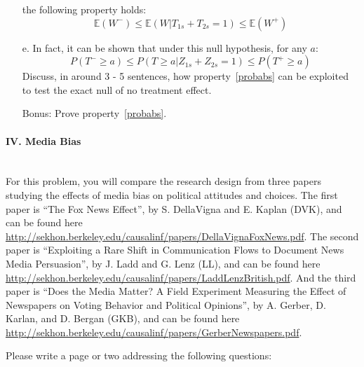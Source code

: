 \documentclass{article}
\newcommand{\E}[0]{\mathbb{E}}
\begin{document}
\begin{itemize}
          the following property holds:
          $$
           \E(W^-)\leq  \E(W| T_{1s} + T_{2s} =1) \leq \E(W^+) 
          $$
        \item[e.]
          In fact, it can be shown that under this null hypothesis, for any $a$:
          \begin{equation}
            P(T^- \geq a) \leq P(T \geq a | Z_{1s} + Z_{2s} = 1) \leq P(T^+ \geq a)
            \label{probabs}
          \end{equation}
          Discuss, in around 3 - 5 sentences, how property~\eqref{probabs} can be
          exploited to test the exact null of no treatment effect. 
        \item[Bonus:]
          Prove property~\eqref{probabs}. 
      \end{itemize}

\paragraph{\Large IV. Media Bias \\ \\}

For this problem, you will compare the research design from three
papers studying the effects of media bias on political attitudes and
choices.  The first paper is ``The Fox News Effect'', by S.
DellaVigna and E. Kaplan (DVK), and can be found here
\url{http://sekhon.berkeley.edu/causalinf/papers/DellaVignaFoxNews.pdf}. The
second paper is ``Exploiting a Rare Shift in Communication Flows to
Document News Media Persuasion'', by J. Ladd and G. Lenz (LL),
and can be found here
\url{http://sekhon.berkeley.edu/causalinf/papers/LaddLenzBritish.pdf}. And
the third paper is ``Does the Media Matter? A Field Experiment
Measuring the Effect of Newspapers on Voting Behavior and Political
Opinions'', by A. Gerber, D. Karlan, and D. Bergan (GKB), and
can be found here
\url{http://sekhon.berkeley.edu/causalinf/papers/GerberNewspapers.pdf}.

\vspace{1em}

Please write a page or two addressing the following questions:
\end{document}
